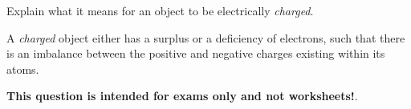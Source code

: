 

Explain what it means for an object to be electrically {\it charged}.







A {\it charged} object either has a surplus or a deficiency of electrons, such that there is an imbalance between the positive and negative charges existing within its atoms.







{\bf This question is intended for exams only and not worksheets!}.



